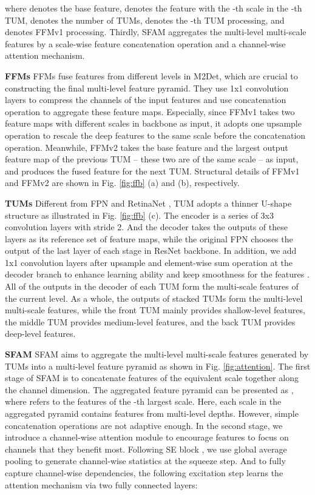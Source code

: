 \documentclass[letterpaper]{article} \usepackage{aaai18}  \usepackage{times}  \usepackage{helvet}  \usepackage{courier}  \usepackage{url}  \usepackage{graphicx}
\begin{document}
where  denotes the base feature,  denotes the feature with the -th scale in the -th TUM,  denotes the number of TUMs,  denotes the -th TUM processing, and  denotes FFMv1 processing. Thirdly, SFAM aggregates the multi-level multi-scale features by a scale-wise feature concatenation operation and a channel-wise attention mechanism.

\textbf{FFMs} FFMs fuse features from different levels in M2Det, which are crucial to constructing the final multi-level feature pyramid. They use 1x1 convolution layers to compress the channels of the input features and use concatenation operation to aggregate these feature maps. Especially, since FFMv1 takes two feature maps with different scales in backbone as input, it adopts one upsample operation to rescale the deep features to the same scale before the concatenation operation. Meanwhile, FFMv2 takes the base feature and the largest output feature map of the previous TUM -- these two are of the same scale -- as input, and produces the fused feature for the next TUM. Structural details of FFMv1 and FFMv2 are shown in Fig. \ref{fig:ffb} (a) and (b), respectively.


\textbf{TUMs} Different from FPN \cite{LinDGHHB17} and RetinaNet \cite{LinGGHD17}, TUM adopts a thinner U-shape structure as illustrated in Fig. \ref{fig:ffb} (c). The encoder is a series of 3x3 convolution layers with stride 2. And the decoder takes the outputs of these layers as its reference set of feature maps, while the original FPN chooses the output of the last layer of each stage in ResNet backbone. In addition, we add 1x1 convolution layers after upsample and element-wise sum operation at the decoder branch to enhance learning ability and keep smoothness for the features \cite{LinCY13}. All of the outputs in the decoder of each TUM form the multi-scale features of the current level. As a whole, the outputs of stacked TUMs form the multi-level multi-scale features, while the front TUM mainly provides shallow-level features, the middle TUM provides medium-level features, and the back TUM provides deep-level features.


\textbf{SFAM}
SFAM aims to aggregate the multi-level multi-scale features generated by TUMs into a multi-level feature pyramid as shown in Fig.  \ref{fig:attention}. The first stage of SFAM is to concatenate features of the equivalent scale together along the channel dimension. The aggregated feature pyramid can be presented as , where  refers to the features of the -th largest scale. Here, each scale in the aggregated pyramid contains features from multi-level depths. However, simple concatenation operations are not adaptive enough. In the second stage, we introduce a channel-wise attention module to encourage features to focus on channels that they benefit most. Following SE block \cite{abs-1709-01507}, we use global average pooling to generate channel-wise statistics  at the squeeze step. And to fully capture channel-wise dependencies, the following excitation step learns the attention mechanism via two fully connected layers:
\end{document}
